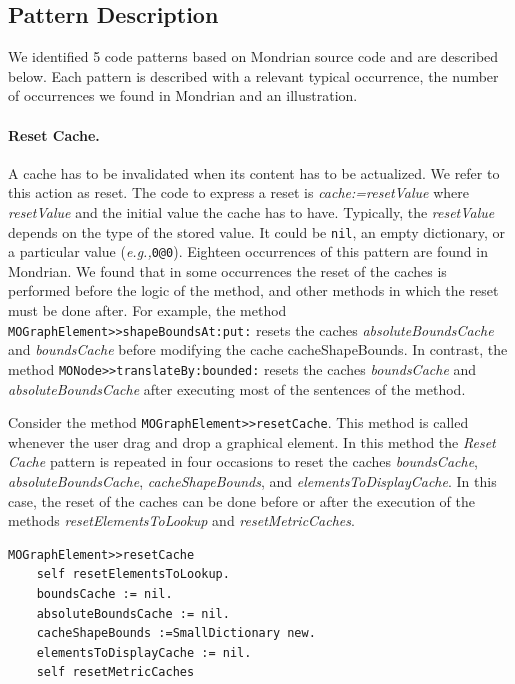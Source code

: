 \documentclass[preprint,10pt]{sigplanconf}
\newcommand{\ct}{\lstinline[backgroundcolor=\color{white},basicstyle=\footnotesize\ttfamily]}
\newcommand{\eg}{\emph{e.g.,}\xspace}
\begin{document}
\subsection{Pattern Description\label{sub:Pattern-Identification}}


We identified 5 code patterns based on Mondrian source code and are described below.
Each pattern is described with a relevant typical occurrence,
the number of occurrences we found in Mondrian and an illustration.

\paragraph{Reset Cache.} A cache has to be invalidated when its content has to be actualized. We refer to this action as reset. The code to express a reset is \emph{cache:=resetValue} where
\emph{resetValue} and the initial value the cache has to have. Typically, the \emph{resetValue} depends on the type of the stored value. It could be \ct{nil}, an empty dictionary, or a particular value (\eg \ct{0@0}).
Eighteen occurrences of this pattern are found in Mondrian. 
We found that in some occurrences the reset of the caches is performed before the logic of the method, and other methods in which the reset must be done after. For example, the method \ct{MOGraphElement>>shapeBoundsAt:put:} resets the caches \emph{absoluteBoundsCache} and \emph{boundsCache} before modifying the cache cacheShapeBounds. In contrast, the method \ct{MONode>>translateBy:bounded:} resets the caches \emph{boundsCache} and \emph{absoluteBoundsCache} after executing most of the sentences of the method. 

Consider the method \ct{MOGraphElement>>resetCache}. This method is called whenever the user drag and drop a graphical element. In
this method the \emph{Reset Cache} pattern is repeated in four occasions
to reset the caches \emph{boundsCache}, \emph{absoluteBoundsCache},
\emph{cacheShapeBounds}, and \emph{elementsToDisplayCache}. In this case, the reset of the caches can be done before or after the execution of the methods \emph{resetElementsToLookup} and  \emph{resetMetricCaches}.

\begin{lstlisting} 
MOGraphElement>>resetCache 
	self resetElementsToLookup.
	boundsCache := nil. 
	absoluteBoundsCache := nil. 
	cacheShapeBounds :=SmallDictionary new. 
	elementsToDisplayCache := nil. 
	self resetMetricCaches
\end{lstlisting}
\end{document}
